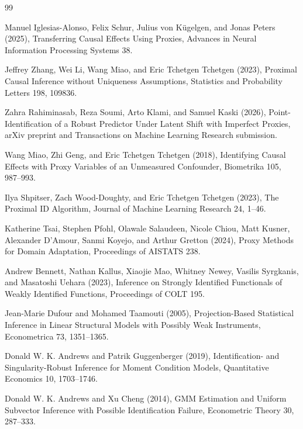 \documentclass{article}
\begin{document}
\begin{thebibliography}{99}

   Manuel Iglesias-Alonso, Felix Schur, Julius von Kügelgen, and Jonas Peters (2025), Transferring Causal Effects Using Proxies, Advances in Neural Information Processing Systems 38.

   Jeffrey Zhang, Wei Li, Wang Miao, and Eric Tchetgen Tchetgen (2023), Proximal Causal Inference without Uniqueness Assumptions, Statistics and Probability Letters 198, 109836.

   Zahra Rahiminasab, Reza Soumi, Arto Klami, and Samuel Kaski (2026), Point-Identification of a Robust Predictor Under Latent Shift with Imperfect Proxies, arXiv preprint and Transactions on Machine Learning Research submission.

   Wang Miao, Zhi Geng, and Eric Tchetgen Tchetgen (2018), Identifying Causal Effects with Proxy Variables of an Unmeasured Confounder, Biometrika 105, 987--993.

   Ilya Shpitser, Zach Wood-Doughty, and Eric Tchetgen Tchetgen (2023), The Proximal ID Algorithm, Journal of Machine Learning Research 24, 1--46.

   Katherine Tsai, Stephen Pfohl, Olawale Salaudeen, Nicole Chiou, Matt Kusner, Alexander D'Amour, Sanmi Koyejo, and Arthur Gretton (2024), Proxy Methods for Domain Adaptation, Proceedings of AISTATS 238.

   Andrew Bennett, Nathan Kallus, Xiaojie Mao, Whitney Newey, Vasilis Syrgkanis, and Masatoshi Uehara (2023), Inference on Strongly Identified Functionals of Weakly Identified Functions, Proceedings of COLT 195.

   Jean-Marie Dufour and Mohamed Taamouti (2005), Projection-Based Statistical Inference in Linear Structural Models with Possibly Weak Instruments, Econometrica 73, 1351--1365.

   Donald W. K. Andrews and Patrik Guggenberger (2019), Identification- and Singularity-Robust Inference for Moment Condition Models, Quantitative Economics 10, 1703--1746.

   Donald W. K. Andrews and Xu Cheng (2014), GMM Estimation and Uniform Subvector Inference with Possible Identification Failure, Econometric Theory 30, 287--333.


\end{thebibliography}
\end{document}
